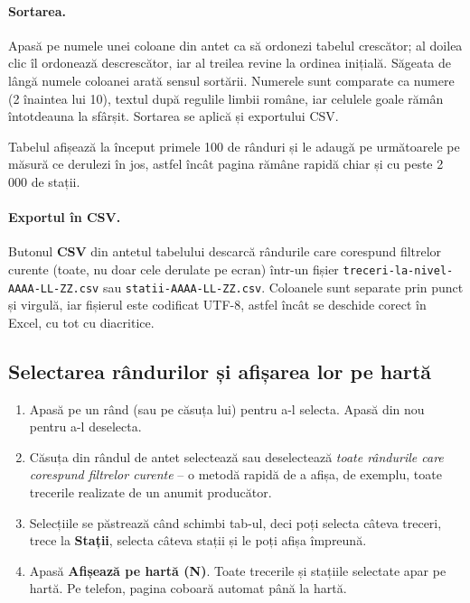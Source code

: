 \documentclass[11pt,a4paper]{article}
\newcommand{\file}[1]{\texttt{#1}}
\newcommand{\ui}[1]{\textsf{\textbf{#1}}}
\begin{document}
\paragraph{Sortarea.} Apasă pe numele unei coloane din antet ca să ordonezi
tabelul crescător; al doilea clic îl ordonează descrescător, iar al treilea
revine la ordinea inițială. Săgeata de lângă numele coloanei arată sensul
sortării. Numerele sunt comparate ca numere (2 înaintea lui 10), textul după
regulile limbii române, iar celulele goale rămân întotdeauna la sfârșit.
Sortarea se aplică și exportului CSV.

Tabelul afișează la început primele 100 de rânduri și le adaugă pe
următoarele pe măsură ce derulezi în jos, astfel încât pagina rămâne rapidă
chiar și cu peste 2\,000 de stații.

\paragraph{Exportul în CSV.} Butonul \ui{CSV} din antetul tabelului descarcă
rândurile care corespund filtrelor curente (toate, nu doar cele derulate pe
ecran) într-un fișier \file{treceri-la-nivel-AAAA-LL-ZZ.csv} sau
\file{statii-AAAA-LL-ZZ.csv}. Coloanele sunt separate prin punct și virgulă,
iar fișierul este codificat UTF-8, astfel încât se deschide corect în Excel,
cu tot cu diacritice.

\subsection{Selectarea rândurilor și afișarea lor pe hartă}

\begin{enumerate}
  \item Apasă pe un rând (sau pe căsuța lui) pentru a-l selecta. Apasă din nou
        pentru a-l deselecta.
  \item Căsuța din rândul de antet selectează sau deselectează \emph{toate
        rândurile care corespund filtrelor curente} -- o metodă rapidă de a
        afișa, de exemplu, toate trecerile realizate de un anumit producător.
  \item Selecțiile se păstrează când schimbi tab-ul, deci poți selecta câteva
        treceri, trece la \ui{Stații}, selecta câteva stații și le poți afișa
        împreună.
  \item Apasă \ui{Afișează pe hartă (N)}. Toate trecerile și stațiile selectate apar pe
        hartă. Pe telefon, pagina coboară automat până la hartă.
\end{enumerate}
\end{document}
